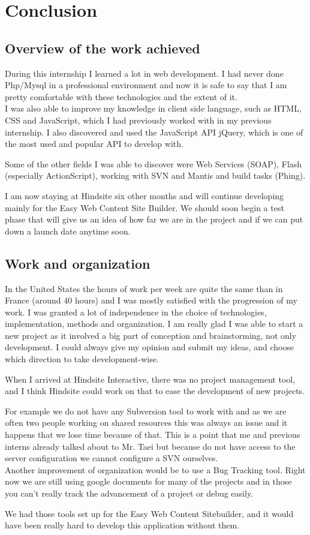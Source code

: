 \chapter*{Conclusion}

\section*{Overview of the work achieved}

During this internship I learned a lot in web development. I had never done 
Php/Mysql in a professional environment and now it is safe to say that I am pretty 
comfortable with these technologies and the extent of it.
\\I was also able to improve my knowledge in client side language, such as HTML, CSS and 
JavaScript, which I had previously worked with in my previous internship. I also discovered 
and used the JavaScript API jQuery, which is one of the most used and popular API to develop with.

Some of the other fields I was able to discover were Web Services (SOAP), Flash (especially ActionScript), 
working with SVN and Mantis and build tasks (Phing).

I am now staying at Hindsite six other months and will continue developing mainly for the Easy 
Web Content Site Builder. We should soon begin a test phase that will give us an idea of how far 
we are in the project and if we can put down a launch date anytime soon.

\section*{Work and organization}

In the United States the hours of work per week are quite the same than in France (around
40 hours) and I was mostly satisfied with the progression of my work.
I was granted a lot of independence in the choice of technologies, implementation,
methods and organization. I am really glad I was able to start a new project as it involved 
a big part of conception and brainstorming, not only development. I could always give my opinion and submit my ideas, and 
choose which direction to take development-wise.

When I arrived at Hindsite Interactive, there was no project management tool, and I think Hindsite could work on that
to ease the development of new projects. 

For example we do not have any Subversion tool to work with and as we are often 
two people working on shared resources this was always an issue and 
it happens that we lose time because of that.
This is a point that me and previous interns already talked about to Mr. Taei but
because do not have access to the server configuration we cannot configure a SVN
ourselves.
\\Another improvement of organization would be to use a Bug Tracking tool. Right now we are still
using google documents for many of the projects and in those you can't really track the advancement of a project or debug easily.

We had those tools set up for the Easy Web Content Sitebuilder, 
and it would have been really hard to develop this application without them.